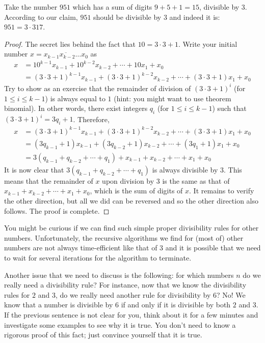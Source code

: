 \begin{example}
	Take the number $951$ which has a sum of digits $9+5+1=15$, divisible by $3$. According to our claim, $951$ should be divisible by $3$ and indeed it is: $951=3\cdot317$.
\end{example}

\begin{proof}
	The secret lies behind the fact that $10 = 3 \cdot 3 + 1$. Write your initial number $x = \overline{x_{k-1} x_{k-2}\ldots x_0}$ as
		\begin{align*}
			x & = 10^{k-1}x_{k-1} + 10^{k-2}x_{k-2} + \cdots + 10x_1 + x_0\\
			&= (3 \cdot 3 + 1)^{k-1}x_{k-1} + (3 \cdot 3 + 1)^{k-2}x_{k-2} + \cdots + (3 \cdot 3 + 1)x_1 + x_0
		\end{align*}
	Try to show as an exercise that the remainder of division of $(3 \cdot 3 + 1)^{i}$ (for $1 \leq i \leq k-1$) is always equal to $1$ (hint: you might want to use theorem \gls{binomial}). In other words, there exist integers $q_i$ (for $1 \leq i \leq k-1$) such that $(3 \cdot 3 + 1)^{i} = 3q_i + 1$. Therefore,
		\begin{align*}
			x &= (3 \cdot 3 + 1)^{k-1}x_{k-1} + (3 \cdot 3 + 1)^{k-2}x_{k-2} + \cdots + (3 \cdot 3 + 1)x_1 + x_0\\
			&= (3q_{k-1}+1)x_{k-1} + (3q_{k-2}+1)x_{k-2} + \cdots  + (3q_{1}+1)x_{1} + x_{0}\\
			&= 3(q_{k-1} + q_{k-2} + \cdots + q_1)  + x_{k-1} + x_{k-2} + \cdots + x_1 + x_0
		\end{align*}
	It is now clear that $3(q_{k-1} + q_{k-2} + \cdots + q_1)$ is always divisible by $3$. This means that the remainder of $x$ upon division by $3$ is the same as that of $x_{k-1} + x_{k-2} + \cdots + x_1 + x_0$, which is the sum of digits of $x$. It remains to verify the other direction, but all we did can be reversed and so the other direction also follows. The proof is complete.
\end{proof}

You might be curious if we can find such simple proper divisibility rules for other numbers. Unfortunately, the recursive algorithms we find for (most of) other numbers are not always time-efficient like that of $3$ and it is possible that we need to wait for several iterations for the algorithm to terminate.

Another issue that we need to discuss is the following: for which numbers $n$ do we really need a divisibility rule? For instance, now that we know the divisibility rules for $2$ and $3$, do we really need another rule for divisibility by $6$? No! We know that a number is divisible by $6$ if and only if it is divisible by both $2$ and $3$. If the previous sentence is not clear for you, think about it for a few minutes and investigate some examples to see why it is true. You don't need to know a rigorous proof of this fact; just convince yourself that it is true.



